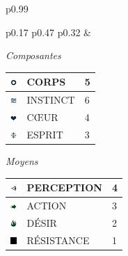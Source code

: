 \documentclass[11pt,twoside,a4paper]{article}
\def\imgCORPS{\includegraphics[width=0.25cm]{../../../../../imgGraphics/rolePlayingGame/SimulacreS/mini12x12/corps.png} }
\def\imgINSTI{\includegraphics[width=0.25cm]{../../../../../imgGraphics/rolePlayingGame/SimulacreS/mini12x12/instinct.png} }
\def\imgCOEUR{\includegraphics[width=0.25cm]{../../../../../imgGraphics/rolePlayingGame/SimulacreS/mini12x12/coeur.png} }
\def\imgESPRI{\includegraphics[width=0.25cm]{../../../../../imgGraphics/rolePlayingGame/SimulacreS/mini12x12/esprit.png} }
\def\imgPERCE{\includegraphics[width=0.25cm]{../../../../../imgGraphics/rolePlayingGame/SimulacreS/mini12x12/perception.png} }
\def\imgACTIO{\includegraphics[width=0.25cm]{../../../../../imgGraphics/rolePlayingGame/SimulacreS/mini12x12/action.png} }
\def\imgDESIR{\includegraphics[width=0.25cm]{../../../../../imgGraphics/rolePlayingGame/SimulacreS/mini12x12/desir.png} }
\def\imgRESIS{\includegraphics[width=0.25cm]{../../../../../imgGraphics/rolePlayingGame/SimulacreS/mini12x12/resistance.png} }
\begin{document}
\begin{longtable}[ht]{ p{} }
\begin{tabular}[h]{ p{} p{} p{} }
		& %
		
			{\centering \emph{Composantes}}	\newline
				{\footnotesize %
				\begin{tabular}[h]{|p{0.25cm}|p{3.00cm}|p{0.75cm}|}
					\hline
					\imgCORPS & CORPS		&	5	\\
					\hline
					\imgINSTI & INSTINCT	&	6	\\
					\hline
					\imgCOEUR & C\OE UR		&	4	\\
					\hline
					\imgESPRI & ESPRIT		&	3	\\
					\hline
				\end{tabular} }
			\newline
			
			{\centering \emph{Moyens}} \newline
				{\footnotesize %
				\begin{tabular}[h]{|p{0.25cm}|p{3.00cm}|p{0.75cm}|}
					\hline
					\imgPERCE &  PERCEPTION		 & 4 \\
					\hline
					\imgACTIO &  ACTION			 & 3 \\
					\hline
					\imgDESIR &  D{\'E}SIR		 & 2 \\
					\hline
					\imgRESIS &  R{\'E}SISTANCE	 & 1 \\
					\hline
				\end{tabular} }
			\newline
			

\end{tabular}
\end{longtable}
\end{document}
